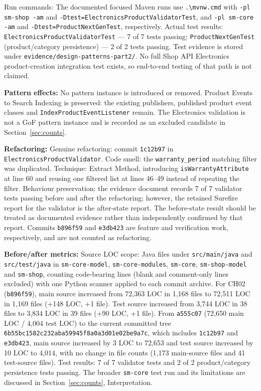 \documentclass[11pt,a4paper]{article}
\begin{document}
Run commands: The documented focused Maven runs use \texttt{.\allowbreak{}\textbackslash mvnw.\allowbreak{}cmd} with \texttt{-pl sm-shop -am} and \texttt{-\allowbreak{}Dtest=ElectronicsProductValidatorTest}, and \texttt{-pl sm-core -am} and \texttt{-\allowbreak{}Dtest=ProductNextGenTest}, respectively. Actual test results: \texttt{Electronics\allowbreak{}Product\allowbreak{}Validator\allowbreak{}Test} --- 7 of 7 tests passing; \texttt{Product\allowbreak{}Next\allowbreak{}Gen\allowbreak{}Test} (product/category persistence) --- 2 of 2 tests passing. Test evidence is stored under \texttt{evidence/\allowbreak{}design-\allowbreak{}patterns-\allowbreak{}part2/\allowbreak{}}. No full Shop API Electronics product-creation integration test exists, so end-to-end testing of that path is not claimed.

\textbf{Pattern effects:} No pattern instance is introduced or removed. Product Events to Search Indexing is preserved: the existing publishers, published product event classes and \texttt{Index\allowbreak{}Product\allowbreak{}Event\allowbreak{}Listener} remain. The Electronics validation is not a GoF pattern instance and is recorded as an excluded candidate in Section~\ref{sec:counts}.

\textbf{Refactoring:} Genuine refactoring: commit \texttt{1c12b97} in \texttt{Electronics\allowbreak{}Product\allowbreak{}Validator}. Code smell: the \texttt{warranty\_period} matching filter was duplicated. Technique: Extract Method, introducing \texttt{is\allowbreak{}Warranty\allowbreak{}Attribute} at line 60 and reusing one filtered list at lines 46--49 instead of repeating the filter. Behaviour preservation: the evidence document records 7 of 7 validator tests passing before and after the refactoring; however, the retained Surefire report for the validator is the after-state report. The before-state result should be treated as documented evidence rather than independently confirmed by that report. Commits \texttt{b896f59} and \texttt{e3db423} are feature and verification work, respectively, and are not counted as refactoring.

\textbf{Before/after metrics:} Source LOC scope: Java files under \texttt{src/main/java} and \texttt{src/test/java} in \texttt{sm-core-model}, \texttt{sm-core-modules}, \texttt{sm-core}, \texttt{sm-shop-model} and \texttt{sm-shop}, counting code-bearing lines (blank and comment-only lines excluded) with one Python scanner applied to each commit archive. For CH02 (\texttt{b896f59}), main source increased from 72,363 LOC in 1,168 files to 72,511 LOC in 1,169 files (+148 LOC, +1 file). Test source increased from 3,744 LOC in 38 files to 3,834 LOC in 39 files (+90 LOC, +1 file). From \texttt{a555c07} (72,650 main LOC / 4,004 test LOC) to the current committed tree \texttt{6b55bc1582c232aba59945f8a0a3d01e02be9a7c}, which includes \texttt{1c12b97} and \texttt{e3db423}, main source increased by 3 LOC to 72,653 and test source increased by 10 LOC to 4,014, with no change in file counts (1,173 main-source files and 41 test-source files). Test results: 7 of 7 validator tests and 2 of 2 product/category persistence tests passing. The broader \texttt{sm-core} test run and its limitations are discussed in Section~\ref{sec:counts}, Interpretation.
\end{document}
